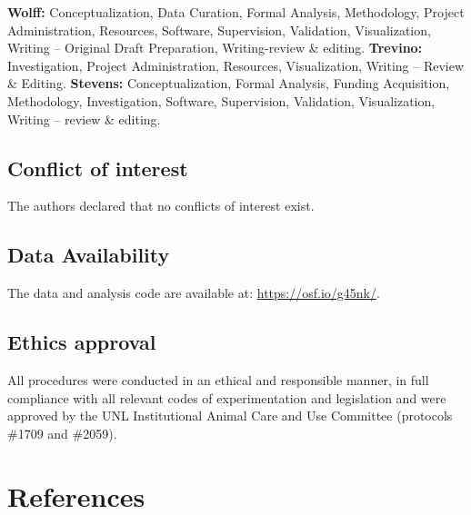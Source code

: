 \documentclass[
  ,pub,floatsintext]{apa6}
\begin{document}
\textbf{Wolff:} Conceptualization, Data Curation, Formal Analysis, Methodology, Project Administration, Resources, Software, Supervision, Validation, Visualization, Writing -- Original Draft Preparation, Writing-review \& editing. \textbf{Trevino:} Investigation, Project Administration, Resources, Visualization, Writing -- Review \& Editing. \textbf{Stevens:} Conceptualization, Formal Analysis, Funding Acquisition, Methodology, Investigation, Software, Supervision, Validation, Visualization, Writing -- review \& editing.

\hypertarget{conflict-of-interest}{%
\subsection{Conflict of interest}\label{conflict-of-interest}}

The authors declared that no conflicts of interest exist.

\hypertarget{data-availability}{%
\subsection{Data Availability}\label{data-availability}}

The data and analysis code are available at: \url{https://osf.io/g45nk/}.

\hypertarget{ethics-approval}{%
\subsection{Ethics approval}\label{ethics-approval}}

All procedures were conducted in an ethical and responsible manner, in full compliance with all relevant codes of experimentation and legislation and were approved by the UNL Institutional Animal Care and Use Committee (protocols \#1709 and \#2059).

\hypertarget{references}{%
\section{References}\label{references}}

\scriptsize
\end{document}
